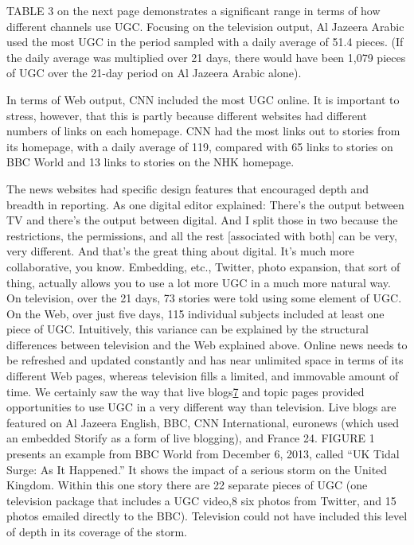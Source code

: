 \documentclass[symmetric, notoc, nobib]{towcenter-book}
\begin{document}
TABLE 3 on the next page demonstrates a significant range in terms of
how different channels use UGC. Focusing on the television output, Al
Jazeera Arabic used the most UGC in the period sampled with a daily average
of 51.4 pieces. (If the daily average was multiplied over 21 days, there
would have been 1,079 pieces of UGC over the 21-day period on Al Jazeera
Arabic alone).

In terms of Web output, CNN included the most UGC online. It is important
to stress, however, that this is partly because different websites had different
numbers of links on each homepage. CNN had the most links out to stories
from its homepage, with a daily average of 119, compared with 65 links to
stories on BBC World and 13 links to stories on the NHK homepage.

The news websites had specific design features that encouraged depth and
breadth in reporting. As one digital editor explained:
There's the output between TV and there's the output between
digital. And I split those in two because the restrictions, the permissions,
and all the rest [associated with both] can be very, very
different. And that's the great thing about digital. It's much more
collaborative, you know. Embedding, etc., Twitter, photo expansion,
that sort of thing, actually allows you to use a lot more UGC in a
much more natural way.
On television, over the 21 days, 73 stories were told using some element
of UGC. On the Web, over just five days, 115 individual subjects included
at least one piece of UGC. Intuitively, this variance can be explained by
the structural differences between television and the Web explained above.
Online news needs to be refreshed and updated constantly and has near
unlimited space in terms of its different Web pages, whereas television fills
a limited, and immovable amount of time.
We certainly saw the way that live blogs{\href{#endnotes}{7}} and topic pages provided opportunities
to use UGC in a very different way than television. Live blogs are
featured on Al Jazeera English, BBC, CNN International, euronews (which
used an embedded Storify as a form of live blogging), and France 24. FIGURE
1 presents an example from BBC World from December 6, 2013, called
``UK Tidal Surge: As It Happened.'' It shows the impact of a serious storm on
the United Kingdom. Within this one story there are 22 separate pieces of
UGC (one television package that includes a UGC video,8 six photos from
Twitter, and 15 photos emailed directly to the BBC). Television could not
have included this level of depth in its coverage of the storm.
\end{document}
